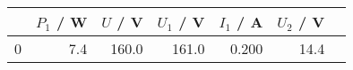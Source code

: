 \begin{tabular}{lrrrrrr}
	\toprule
	{} & $P_1$ / \si{\watt} & $U$ / \si{\volt} & $U_1$ / \si{\volt} & $I_1$ / \si{\ampere} & $U_2$ / \si{\volt} \\
	\midrule
	0  & 7.4                & 160.0            & 161.0              & 0.200                & 14.4               \\
	\bottomrule
\end{tabular}
